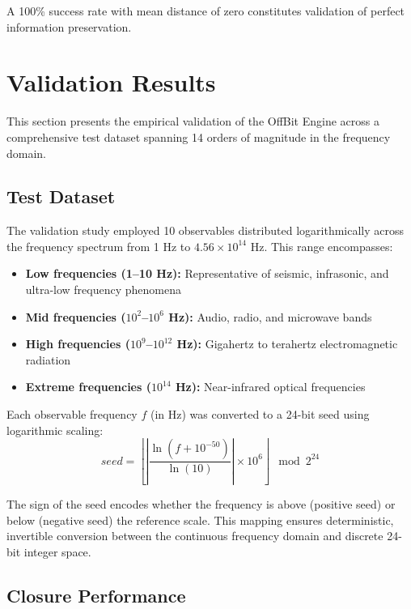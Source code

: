 \documentclass[11pt,letterpaper]{article}
\begin{document}
A 100\% success rate with mean distance of zero constitutes validation of perfect information preservation.

\section{Validation Results}
\label{sec:results}

This section presents the empirical validation of the OffBit Engine across a comprehensive test dataset spanning 14 orders of magnitude in the frequency domain.

\subsection{Test Dataset}
\label{subsec:dataset}

The validation study employed 10 observables distributed logarithmically across the frequency spectrum from 1 Hz to $4.56 \times 10^{14}$ Hz. This range encompasses:

\begin{itemize}
    \item \textbf{Low frequencies (1--10 Hz):} Representative of seismic, infrasonic, and ultra-low frequency phenomena
    \item \textbf{Mid frequencies ($10^2$--$10^6$ Hz):} Audio, radio, and microwave bands
    \item \textbf{High frequencies ($10^9$--$10^{12}$ Hz):} Gigahertz to terahertz electromagnetic radiation
    \item \textbf{Extreme frequencies ($10^{14}$ Hz):} Near-infrared optical frequencies
\end{itemize}

Each observable frequency $f$ (in Hz) was converted to a 24-bit seed using logarithmic scaling:
\begin{equation}
seed = \left\lfloor \left| \frac{\ln(f + 10^{-50})}{\ln(10)} \right| \times 10^6 \right\rfloor \mod 2^{24}
\end{equation}

The sign of the seed encodes whether the frequency is above (positive seed) or below (negative seed) the reference scale. This mapping ensures deterministic, invertible conversion between the continuous frequency domain and discrete 24-bit integer space.

\subsection{Closure Performance}
\label{subsec:performance}
\end{document}
